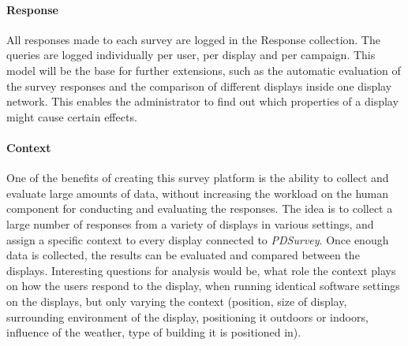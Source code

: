 	\paragraph{Response} All responses made to each survey are logged in the Response collection. The queries are logged individually per user, per display and per campaign. This model will be the base for further extensions, such as the automatic evaluation of the survey responses and the comparison of different displays inside one display network. This enables the administrator to find out which properties of a display might cause certain effects.

	\paragraph{Context} One of the benefits of creating this survey platform is the ability to collect and evaluate large amounts of data, without increasing the workload on the human component for conducting and evaluating the responses. The idea is to collect a large number of responses from a variety of displays in various settings, and assign a specific context to every display connected to \textit{PDSurvey}. Once enough data is collected, the results can be evaluated and compared between the displays. Interesting questions for analysis would be, what role the context plays on how the users respond to the display, when running identical software settings on the displays, but only varying the context (position, size of display, surrounding environment of the display, positioning it outdoors or indoors, influence of the weather, type of building it is positioned in).



